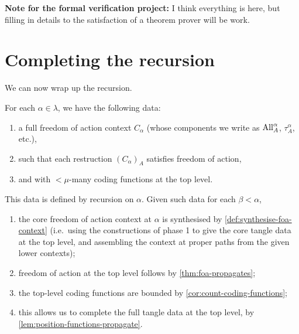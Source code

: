 {\bf Note for the formal verification project:}  I think everything is here, but filling in details to the satisfaction of a theorem prover will be work.

\section{Completing the recursion}

We can now wrap up the recursion.

\begin{definition}
  \label{def:main-recursion}
  For each $\alpha \in \lambda$, we have the following data:
  \begin{enumerate}
  \item a full freedom of action context $C_\alpha$ (whose components we write as $\mathrm{All}^\alpha_A$, $\tau^\alpha_A$, etc.),
  \item such that each restruction $(C_\alpha)_A$ satisfies freedom of action,
  \item and with $<\mu$-many coding functions at the top level.
  \end{enumerate}

  This data is defined by recursion on $\alpha$.  Given such data for each $\beta < \alpha$,
  \begin{enumerate}
  \item the core freedom of action context at $\alpha$ is synthesised by \cref{def:synthesise-foa-context} (i.e.\ using the constructions of phase 1 to give the core tangle data at the top level, and assembling the context at proper paths from the given lower contexts);
  \item freedom of action at the top level follows by \cref{thm:foa-propagates};
  \item the top-level coding functions are bounded by \cref{cor:count-coding-functions};
  \item this allows us to complete the full tangle data at the top level, by \cref{lem:position-functions-propagate}.
  \end{enumerate}
\end{definition}

